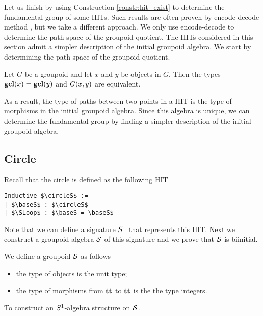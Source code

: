 Let us finish by using Construction \ref{constr:hit_exist} to determine the fundamental group of some HITs.
Such results are often proven by encode-decode method \cite{LicataS13,LicataF14}, but we take a different approach.
We only use encode-decode to determine the path space of the groupoid quotient.
The HITs considered in this section admit a simpler description of the initial groupoid algebra.
We start by determining the path space of the groupoid quotient.

\begin{proposition}
\label{prop:groupoid_quot_encode_decode}
Let $G$ be a groupoid and let $x$ and $y$ be objects in $G$.
Then the types $\operatorname{\mathbf{gcl}}(x) = \operatorname{\mathbf{gcl}}(y)$ and $G(x, y)$ are equivalent.
\end{proposition}

As a result, the type of paths between two points in a HIT is the type of morphisms in the initial groupoid algebra.
Since this algebra is unique, we can determine the fundamental group by finding a simpler description of the initial groupoid algebra.

\subsection{Circle}
\label{sec:circle_fund_group}
Recall that the circle is defined as the following HIT

\begin{lstlisting}[mathescape=true]
Inductive $\circleS$ :=
| $\baseS$ : $\circleS$
| $\SLoop$ : $\baseS = \baseS$
\end{lstlisting}

Note that we can define a signature $S^1$ that represents this HIT.
Next we construct a groupoid algebra $\mathcal{S}$ of this signature and we prove that $\mathcal{S}$ is biinitial.

\begin{definition}
We define a groupoid $\mathcal{S}$ as follows
\begin{itemize}
	\item the type of objects is the unit type;
	\item the type of morphisms from $\operatorname{\mathbf{tt}}$ to $\operatorname{\mathbf{tt}}$ is the the type integers.
\end{itemize}
\end{definition}

\begin{problem}
\label{prob:initial_grpd_alg_circle}
To construct an $S^1$-algebra structure on $\mathcal{S}$.
\end{problem}

